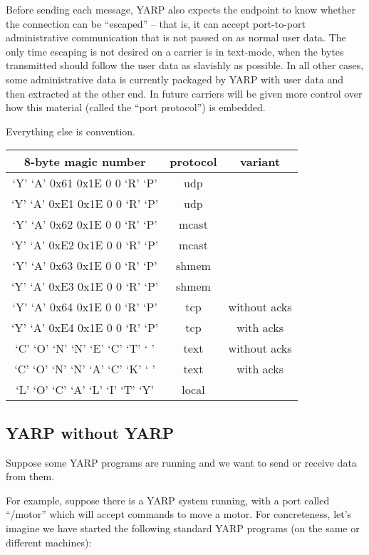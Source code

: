 Before sending each message, YARP also expects the endpoint to know
whether the connection can be ``escaped'' -- that is, it can accept
port-to-port administrative communication that is not passed on as
normal user data.  The only time escaping is not desired on a carrier
is in text-mode, when the bytes transmitted should follow the user
data as slavishly as possible.  In all other cases, some
administrative data is currently packaged by YARP with user data and
then extracted at the other end.  In future carriers will be given
more control over how this material (called the ``port protocol'') is
embedded.

Everything else is convention.

\begin{tabular}{c|c|c}
\hline
8-byte magic number&protocol&variant \\\hline
`Y' `A' 0x61 0x1E 0 0 `R' `P'&udp&\\\hline
`Y' `A' 0x\-E1 0x1E 0 0 `R' `P'&udp&\\\hline
`Y' `A' 0x62 0x1E 0 0 `R' `P'&mcast&\\\hline
`Y' `A' 0x\-E2 0x1E 0 0 `R' `P'&mcast&\\\hline
`Y' `A' 0x63 0x1E 0 0 `R' `P'&shmem&\\\hline
`Y' `A' 0x\-E3 0x1E 0 0 `R' `P'&shmem&\\\hline
`Y' `A' 0x64 0x1E 0 0 `R' `P'&tcp&without acks \\\hline
`Y' `A' 0x\-E4 0x1E 0 0 `R' `P'&tcp&with acks \\\hline
`C' `O' `N' `N' `E' `C' `T' ` ' &text&without acks \\\hline
`C' `O' `N' `N' `A' `C' `K' ` ' &text&with acks \\\hline
`L' `O' `C' `A' `L' `I' `T' `Y'&local&\\\hline
\end{tabular}



\subsection{YARP without YARP}

Suppose some YARP programs are running and we want to send or
receive data from them.

For example, suppose there is a YARP system running, with a 
port called ``/motor'' which will accept commands to move a
motor.  For concreteness, let's imagine we have started the
following standard YARP programs (on the same or different 
machines):

